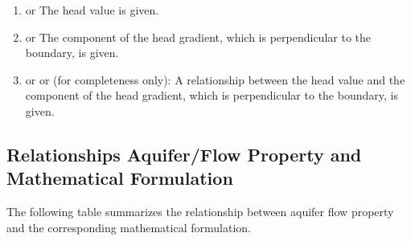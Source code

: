\documentclass[letterpaper,10pt,english]{jupyterBook}
\begin{document}
\begin{figure}[htbp]
\centering

\noindent{}
\end{figure}
\begin{enumerate}
%
\item {} 
\sphinxAtStartPar
{} or  \sphinxhyphen{} The head value is given.

\item {} 
\sphinxAtStartPar
{} or  \sphinxhyphen{} The component of the head gradient, which is perpendicular to the boundary, is given.

\item {} 
\sphinxAtStartPar
{} or  or  (for completeness only): \sphinxhyphen{} A relationship between the head value and the component of the head gradient, which is perpendicular to the boundary, is given.

\end{enumerate}


\subsection{Relationships Aquifer/Flow Property and Mathematical Formulation}
\label{\detokenize{content/flow/L7/17_quantify_flow:relationships-aquifer-flow-property-and-mathematical-formulation}}
\sphinxAtStartPar
The following table summarizes the relationship between aquifer flow property and the corresponding mathematical formulation.
\end{document}

